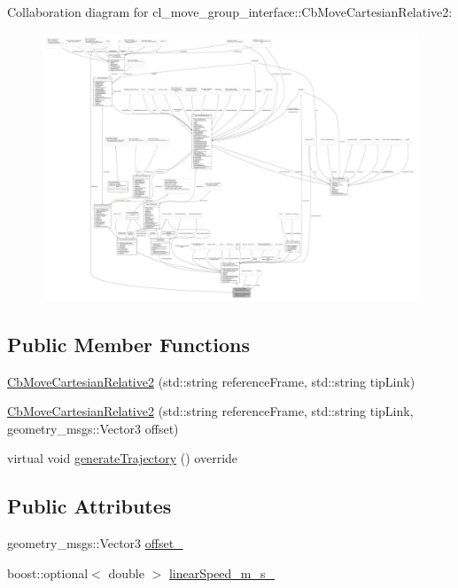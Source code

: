 Collaboration diagram for cl\+\_\+move\+\_\+group\+\_\+interface\+:\+:Cb\+Move\+Cartesian\+Relative2\+:
\nopagebreak
\begin{figure}[H]
\begin{center}
\leavevmode
\includegraphics[width=350pt]{classcl__move__group__interface_1_1CbMoveCartesianRelative2__coll__graph}
\end{center}
\end{figure}
\subsection*{Public Member Functions}
\begin{DoxyCompactItemize}
\item 
\hyperlink{classcl__move__group__interface_1_1CbMoveCartesianRelative2_ad6cf2bdb1e7f6ad757641eea18127918}{Cb\+Move\+Cartesian\+Relative2} (std\+::string reference\+Frame, std\+::string tip\+Link)
\item 
\hyperlink{classcl__move__group__interface_1_1CbMoveCartesianRelative2_ae3ba62df9a3045d0d0aeb803e03ef0a6}{Cb\+Move\+Cartesian\+Relative2} (std\+::string reference\+Frame, std\+::string tip\+Link, geometry\+\_\+msgs\+::\+Vector3 offset)
\item 
virtual void \hyperlink{classcl__move__group__interface_1_1CbMoveCartesianRelative2_a6ba51647d197e874a87289a90ff8e0f1}{generate\+Trajectory} () override
\end{DoxyCompactItemize}
\subsection*{Public Attributes}
\begin{DoxyCompactItemize}
\item 
geometry\+\_\+msgs\+::\+Vector3 \hyperlink{classcl__move__group__interface_1_1CbMoveCartesianRelative2_a38e3c82a5fac0028a1d74eba4e478181}{offset\+\_\+}
\item 
boost\+::optional$<$ double $>$ \hyperlink{classcl__move__group__interface_1_1CbMoveCartesianRelative2_abad921ee22381db86544263e2f8ff03a}{linear\+Speed\+\_\+m\+\_\+s\+\_\+}
\end{DoxyCompactItemize}
